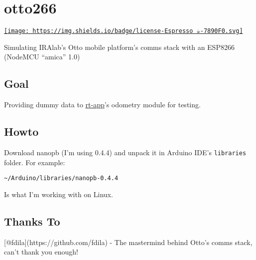 \hypertarget{otto266}{%
\section{otto266}\label{otto266}}

\href{https://github.com/jack23247/espresso-license}{\texttt{[image: https://img.shields.io/badge/license-Espresso ☕-7890F0.svg]}}

Simulating IRAlab's Otto mobile platform's comms stack with an ESP8266
(NodeMCU ``amica'' 1.0)

\hypertarget{goal}{%
\subsection{Goal}\label{goal}}

Providing dummy data to
\href{https://github.com/iralabdisco/rt-app}{rt-app}'s odometry module
for testing.

\hypertarget{howto}{%
\subsection{Howto}\label{howto}}

Download nanopb (I'm using 0.4.4) and unpack it in Arduino IDE's
\texttt{libraries} folder. For example:

\begin{verbatim}
~/Arduino/libraries/nanopb-0.4.4
\end{verbatim}

Is what I'm working with on Linux.

\hypertarget{thanks-to}{%
\subsection{Thanks To}\label{thanks-to}}

{[}@fdila{]}(https://github.com/fdila) - The mastermind behind Otto's
comms stack, can't thank you enough!
